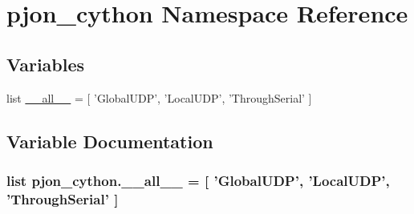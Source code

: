 \hypertarget{namespacepjon__cython}{\section{pjon\-\_\-cython Namespace Reference}
\label{namespacepjon__cython}
}
\subsection*{Variables}
\begin{DoxyCompactItemize}
\item 
list \hyperlink{namespacepjon__cython_a873dbba9ca3e11882ac10115291eed07}{\-\_\-\-\_\-all\-\_\-\-\_\-} = \mbox{[} 'Global\-U\-D\-P', 'Local\-U\-D\-P', 'Through\-Serial' \mbox{]}
\end{DoxyCompactItemize}


\subsection{Variable Documentation}
\hypertarget{namespacepjon__cython_a873dbba9ca3e11882ac10115291eed07}{
\subsubsection[{\-\_\-\-\_\-all\-\_\-\-\_\-}]{\setlength{\rightskip}{0pt plus 5cm}list pjon\-\_\-cython.\-\_\-\-\_\-all\-\_\-\-\_\- = \mbox{[} 'Global\-U\-D\-P', 'Local\-U\-D\-P', 'Through\-Serial' \mbox{]}}}\label{namespacepjon__cython_a873dbba9ca3e11882ac10115291eed07}
